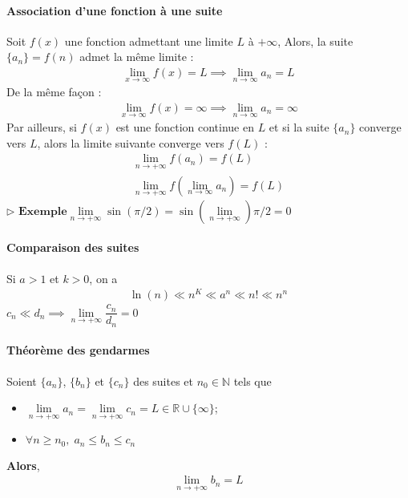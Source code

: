 \documentclass{report}
\begin{document}
\begin{multicols*}{3}
    \paragraph{Association d'une fonction à une suite}
        Soit $f\left(x\right)$ une fonction admettant une limite $L$ à 
        $\text{+}\infty$, Alors, la suite 
        $\{a_n\} = f\left(n\right)$ admet la même limite : 
        \begin{align*}
          \lim\limits_{x\to\infty  }f(x) = L \implies \lim\limits_{n\to\infty  }a_n = L
        \end{align*}
        De la même façon :
        \begin{align*}
          \lim\limits_{x\to\infty  }f(x) = \infty \implies \lim\limits_{n\to\infty  }a_n = \infty
        \end{align*}
        Par ailleurs, si $f\left(x\right)$ est une fonction continue en 
        $L$ et si la suite $\{a_n\}$
        converge vers $L$, alors la limite suivante converge vers $f\left(L\right)$ :
        \begin{align*}
                    \lim\limits_{n\to+\infty  }f(a_n)  = f(L) \\ 
                    \lim\limits_{n\to+\infty  }f(\lim\limits_{n \to \infty} a_n)  
                    = f(L)  
        \end{align*}
        $\rhd$ $ \textbf{Exemple}  \lim\limits_{n \to+\infty }\sin(\pi/2)  = 
        \sin(\lim\limits_{n \to+\infty })  \pi/2  = 0$




    \paragraph{Comparaison des suites}
        Si $a > 1$ et $k > 0$, on a 
        \begin{align*}
            \ln(n) \ll n^K \ll a^n \ll n! \ll n^n
        \end{align*}
        $c_n \ll d_n \implies 
        \lim\limits_{n\to+\infty }\dfrac{c_n}{d_n} = 0$ 


    \paragraph{Théorème des gendarmes}{}
        Soient $\{a_n\}$, $\{b_n\}$ et $\{c_n\}$ des suites et $n_0 \in \mathbb{N}$ tels 
        que
        \begin{itemize}
            \item $\lim\limits_{n\to+\infty }a_n  = 
                \lim\limits_{n\to+\infty }c_n  = L 
                \in \mathbb{R} \cup \{\infty \}$; 
            \item $\forall n \geq n_0, \; a_n \leq b_n \leq c_n$ 
        \end{itemize}
        \textbf{Alors},
        \begin{align*}
            \lim\limits_{n\to+\infty}b_n  = L                   
        \end{align*}




\end{multicols*}
\end{document}
